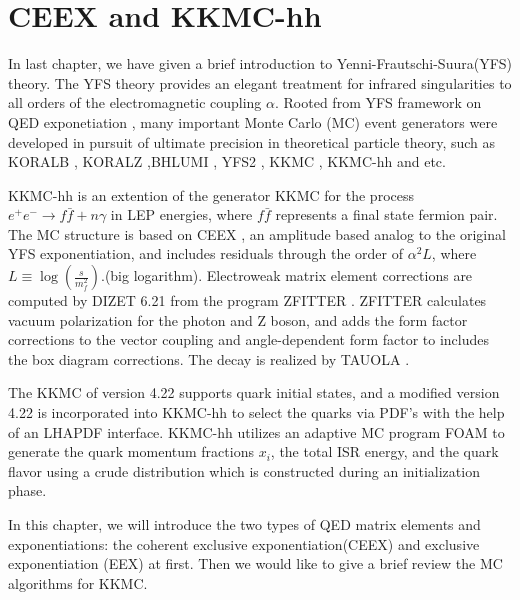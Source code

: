 \chapter{CEEX and KKMC-hh }
In last chapter, we have given a brief introduction to Yenni-Frautschi-Suura(YFS) theory. The YFS theory provides an elegant treatment for infrared singularities to all orders of the electromagnetic coupling $\alpha$. Rooted from YFS framework on QED exponetiation \cite{YFS}, many important Monte Carlo (MC) event generators were developed in pursuit of ultimate precision in theoretical particle theory, such as KORALB \cite{KORALB}, KORALZ \cite{KORALZ},BHLUMI \cite{BHLUMI1,BHLUMI2}, YFS2 \cite{YFS2}, KKMC \cite{KKMC}, KKMC-hh \cite{KKMC-hh1, KKMC-hh2, KKMC0hh3} and etc. 


KKMC-hh is an extention of the generator KKMC for the process $e^+ e^- \to f\bar{f} + n\gamma$ in LEP energies, where $f\bar{f}$ represents a final state fermion pair. The MC structure is based on CEEX \cite{KKMC,CEEX1,CEEX2,CEEX5}, an amplitude based analog to the original YFS exponentiation, and includes residuals through the order of $\alpha^2 L$, where $L\equiv\log(\frac{s}{m^2_f})$.(big logarithm). Electroweak matrix element corrections are computed by DIZET 6.21 from the program ZFITTER \cite{ZFITTER}. ZFITTER calculates vacuum polarization for the photon and Z boson, and adds the form factor corrections to the vector coupling and angle-dependent form factor to includes the box diagram corrections. The decay is realized by TAUOLA \cite{TAULO1,TAULO3,TAULO4}.

The KKMC of version 4.22 supports quark initial states, and a modified version 4.22 is incorporated into KKMC-hh to select the quarks via PDF's with the help of an LHAPDF\cite{LHAPDF} interface. KKMC-hh utilizes an adaptive MC program FOAM \cite{FOAM} to generate the quark momentum fractions $x_i$, the total ISR energy, and the quark flavor using a crude distribution which is constructed during an initialization phase.

In this chapter, we will introduce the two types of QED matrix elements and exponentiations: the coherent exclusive exponentiation(CEEX) and exclusive exponentiation (EEX) at first. Then we would like to give a brief review the MC algorithms for KKMC. 

